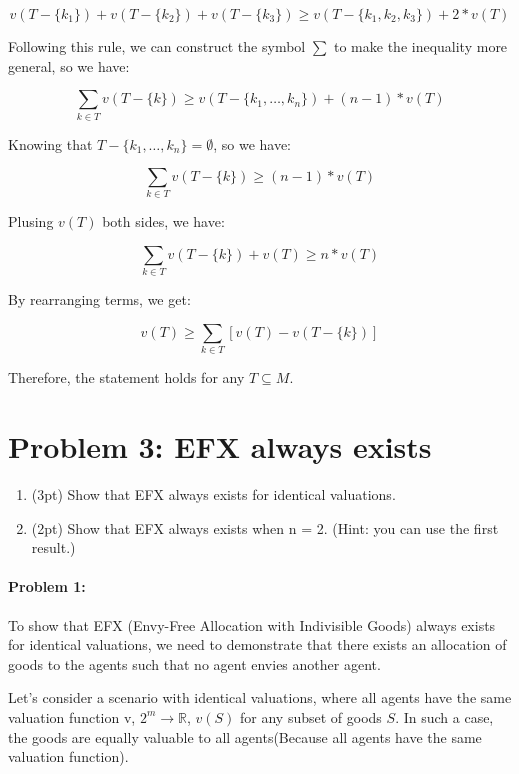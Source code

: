 \documentclass{article}
\begin{document}
\begin{enumerate}
   \[
      v(T - \{k_1\}) + v(T - \{k_2\}) + v(T - \{k_3\}) \ge v(T - \{k_1,k_2,k_3\}) + 2 * v(T)
   \]

   Following this rule, we can construct the symbol $\sum$ to make the inequality more general, so we have:

   \[
      \sum_{k \in T} v(T - \{k\}) \ge v(T - \{k_1,\ldots,k_n\}) + (n-1) * v(T)
   \]

   Knowing that $T - \{k_1,\ldots,k_n\} = \emptyset$, so we have:

   \[
      \sum_{k \in T} v(T - \{k\}) \ge (n-1) * v(T)
   \]

   Plusing $v(T)$ both sides, we have:

   \[
      \sum_{k \in T} v(T - \{k\}) + v(T) \ge n * v(T)
   \]
   

   By rearranging terms, we get:
   
   \[
     v(T) \ge \sum_{k \in T}[v(T) - v(T - \{k\})]
   \]
   
   Therefore, the statement holds for any $T \subseteq M$.

\end{enumerate}


\section{Problem 3: EFX always exists}

\begin{enumerate}
   \item (3pt) Show that EFX always exists for identical valuations.
   \item (2pt) Show that EFX always exists when n = 2. (Hint: you can use the first result.)
\end{enumerate}

\paragraph{Problem 1:}
To show that EFX (Envy-Free Allocation with Indivisible Goods) always exists for identical valuations, we need to demonstrate that there exists an allocation of goods to the agents such that no agent envies another agent.

Let's consider a scenario with identical valuations, where all agents have the same valuation function v, $2^m \rightarrow \mathbb{R}$, $v(S)$ for any subset of goods $S$. In such a case, the goods are equally valuable to all agents(Because all agents have the same valuation function). 
\end{document}
